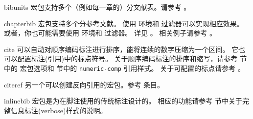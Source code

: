 \begin{marglist}
\item[bibunits]
 宏包支持多个（例如每一章的）分文献表。请参考 。

\item[chapterbib]
 宏包支持多个分参考文献。
使用  环境和  过滤器可以实现相应效果。
或者，你也可能需要使用  环境和  过滤器。
详见 。
相关例子请参考 。

\item[cite]
 可以自动对顺序编码标注进行排序，能将连续的数字压缩为一个区间。
它也可以配置标注(引用)中的标点符号。
关于顺序编码标注的排序和缩写，请参考  节中的  宏包选项和  节中的 \texttt{numeric-comp} 引用样式。
关于可配置的标点请参考 。

\item[citeref]
另一个可以创建反向引用的宏包。参考  条目。

\item[inlinebib]
 宏包是为在脚注使用的传统标注设计的。
相应的功能请参考  节中关于完整信息标注(verbose)样式的说明。%


\end{marglist}
